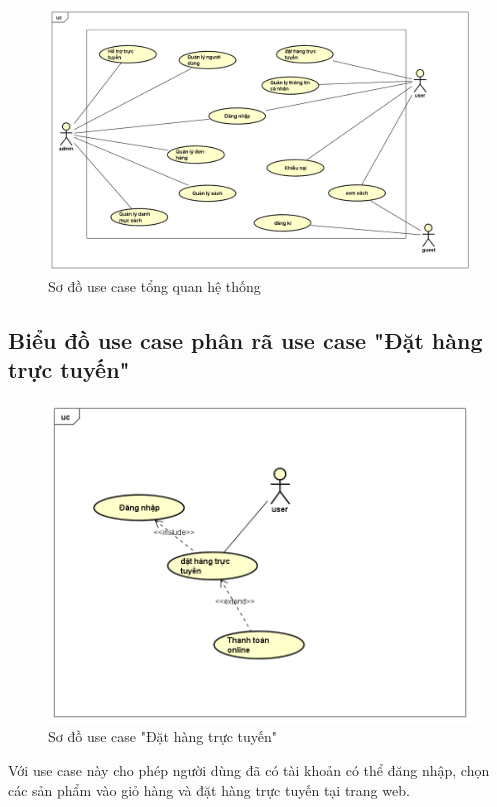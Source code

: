 \documentclass[../DoAn.tex]{subfiles}
\begin{document}
\begin{figure}[H] %
\centering
\includegraphics[width=1\linewidth]{Hinhve/thiết kế tổng quát.png}
\caption{Sơ đồ use case tổng quan hệ thống}
\label{fig:UsecaseOverview}
\end{figure}


\subsection{Biểu đồ use case phân rã use case "Đặt hàng trực tuyến"}
\label{subsection:2.2.2}

\begin{figure}[H] %
\centering
\includegraphics[width=1\linewidth]{Hinhve/Đạt hàng trực tuyến.png}
\caption{Sơ đồ use case "Đặt hàng trực tuyến"}
\label{fig:UsecaseOrderOnline}
\end{figure}
Với use case này cho phép người dùng đã có tài khoản có thể đăng nhập, chọn các sản phẩm vào giỏ hàng và đặt hàng trực tuyến tại trang web.
\end{document}
